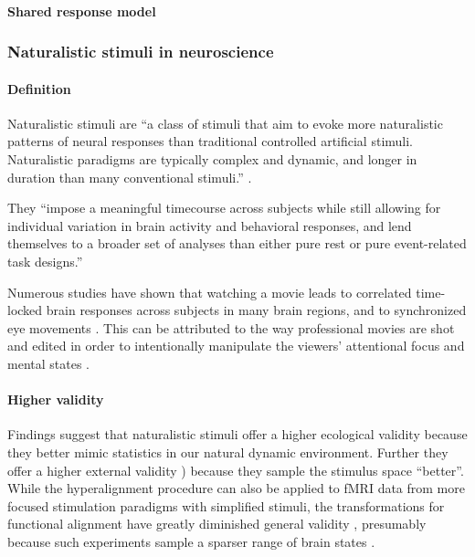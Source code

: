 \paragraph{Shared response model}

\citep{chen2015reduced}


\subsubsection{Naturalistic stimuli in neuroscience}


\paragraph{Definition}
%
Naturalistic stimuli are ``a class of stimuli that aim to evoke more
naturalistic patterns of neural responses than traditional controlled artificial
stimuli. Naturalistic paradigms are typically complex and dynamic, and longer
in duration than many conventional stimuli.'' \citep{vanderwal2019movies}.

%
They ``impose a meaningful timecourse across subjects while still allowing for
individual variation in brain activity and behavioral responses, and lend
themselves to a broader set of analyses than either pure rest or pure
event-related task designs.'' \citep{finn2017can}

%
Numerous studies have shown that watching a movie leads to correlated
time-locked brain responses across subjects in many brain regions, and to
synchronized eye movements \citep{hasson2010reliability, lankinen2014isc-meg}.
%
This can be attributed to the way professional movies are shot and edited in
order to intentionally manipulate the viewers' attentional focus and mental
states \citep{brown2012cinematography, dancyger2011film-technique}.


\paragraph{Higher validity}
%
Findings suggest that naturalistic stimuli offer a higher
ecological validity \citep{hasson2004intersubject} because they better mimic
statistics in our natural dynamic environment.
%
Further they offer a higher external validity \citep{westfall2016fixing})
because they sample the stimulus space ``better''.
%
While the hyperalignment procedure can also be applied to fMRI data from more
focused stimulation paradigms with simplified stimuli, the transformations for
functional alignment have greatly diminished general validity
\citep{haxby2011common}, presumably because such experiments sample a sparser
range of brain states \citep{guntupalli2016model}.

